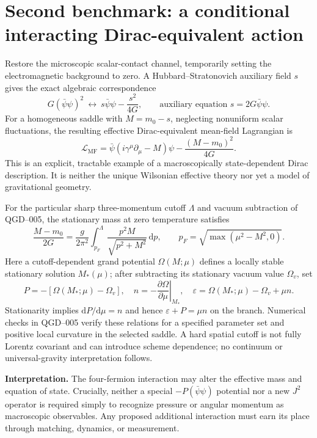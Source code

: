 \documentclass[11pt,a4paper]{article}
\newcommand{\dd}{\mathrm d}
\newcommand{\Lagr}{\mathcal L}
\begin{document}
\section{Second benchmark: a conditional interacting Dirac-equivalent action}\label{sec:meanfield}
Restore the microscopic scalar-contact channel, temporarily setting the electromagnetic background to zero. A Hubbard--Stratonovich auxiliary field $s$ gives the exact algebraic correspondence
\begin{equation}\label{eq:HS}
G(\bar\psi\psi)^2\ \longleftrightarrow\ s\bar\psi\psi-\frac{s^2}{4G},
\qquad\text{auxiliary equation }s=2G\bar\psi\psi.
\end{equation}
For a homogeneous saddle with $M=m_0-s$, neglecting nonuniform scalar fluctuations, the resulting effective Dirac-equivalent mean-field Lagrangian is
\begin{equation}\label{eq:meanfield}
\boxed{\Lagr_{\mathrm{MF}}=\bar\psi(i\gamma^\mu\partial_\mu-M)\psi-\frac{(M-m_0)^2}{4G}.}
\end{equation}
This is an explicit, tractable example of a macroscopically state-dependent Dirac description. It is neither the unique Wilsonian effective theory nor yet a model of gravitational geometry.

For the particular sharp three-momentum cutoff $\Lambda$ and vacuum subtraction of QGD--005, the stationary mass at zero temperature satisfies
\begin{equation}\label{eq:gap}
\frac{M-m_0}{2G}=\frac{g}{2\pi^2}\int_{p_F}^{\Lambda}\frac{p^2M}{\sqrt{p^2+M^2}}\,\dd p,
\qquad p_F=\sqrt{\max(\mu^2-M^2,0)}.
\end{equation}
Here a cutoff-dependent grand potential $\Omega(M;\mu)$ defines a locally stable stationary solution $M_*(\mu)$; after subtracting its stationary vacuum value $\Omega_v$, set
\begin{equation}\label{eq:interacting-eos}
P=-[\Omega(M_*;\mu)-\Omega_v],\quad
n=-\left.\frac{\partial\Omega}{\partial\mu}\right|_{M_*},\quad
\varepsilon=\Omega(M_*;\mu)-\Omega_v+\mu n.
\end{equation}
Stationarity implies $\dd P/\dd\mu=n$ and hence $\varepsilon+P=\mu n$ on the branch. Numerical checks in QGD--005 verify these relations for a specified parameter set and positive local curvature in the selected saddle. A hard spatial cutoff is not fully Lorentz covariant and can introduce scheme dependence; no continuum or universal-gravity interpretation follows.

\noindent\textbf{Interpretation.} The four-fermion interaction may alter the effective mass and equation of state. Crucially, neither a special $-P(\bar\psi\psi)$ potential nor a new $J^2$ operator is required simply to recognize pressure or angular momentum as macroscopic observables. Any proposed additional interaction must earn its place through matching, dynamics, or measurement.
\end{document}
